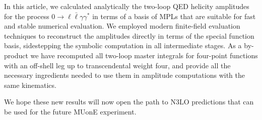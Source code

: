 \documentclass[main.tex]{subfiles}
\begin{document}
In this article, we calculated analytically the two-loop \ac{QED} helicity amplitudes for the process $0\to\ell\bar\ell\gamma\gamma^*$  in
terms of a basis of \aclp{MPL} that are suitable for fast and
stable numerical evaluation. We employed modern finite-field evaluation
techniques to reconstruct the amplitudes directly in terms of the special
function basis, sidestepping the symbolic computation in all intermediate stages. As a by-product we have recomputed all two-loop master
integrals for four-point functions with an off-shell leg up to transcendental weight four, and provide all the
necessary ingredients needed to use them in amplitude computations with the
same kinematics.

We hope these new results will now open the path to \ac{N3LO} predictions that
can be used for the future MUonE experiment.
\end{document}
